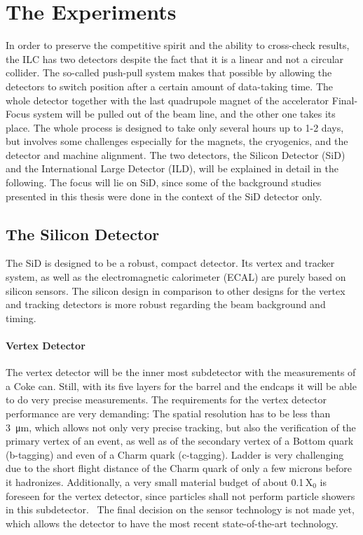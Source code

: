 \newpage
\section{The Experiments}
\label{ILC:detectors}
In order to preserve the competitive spirit and the ability to cross-check results, the ILC has two detectors despite the fact that it is a linear and not a circular collider.
The so-called push-pull system makes that possible by allowing the detectors to switch position after a certain amount of data-taking time.
The whole detector together with the last quadrupole magnet of the accelerator Final-Focus system will be pulled out of the beam line, and the other one takes its place.
The whole process is designed to take only several hours up to 1-2 days, but involves some challenges especially for the magnets, the cryogenics, and the detector and machine alignment.\cite[p. 28-29]{TDR1}
The two detectors, the Silicon Detector (SiD) and the International Large Detector (ILD), will be explained in detail in the following.
The focus will lie on SiD, since some of the background studies presented in this thesis were done in the context of the SiD detector only.

\subsection{The Silicon Detector}
The SiD is designed to be a robust, compact detector.
Its vertex and tracker system, as well as the electromagnetic calorimeter (ECAL) are purely based on silicon sensors.
The silicon design in comparison to other designs for the vertex and tracking detectors is more robust regarding the beam background and timing.~\cite[cf. p. 57ff]{TDR4}
\paragraph{Vertex Detector}
The vertex detector will be the inner most subdetector with the measurements of a Coke can.
Still, with its five layers for the barrel and the endcaps it will be able to do very precise measurements.
The requirements for the vertex detector performance are very demanding:
The spatial resolution has to be less than \SI{3}{\micro\meter}, which allows not only very precise tracking, but also the verification of the primary vertex of an event, as well as of the secondary vertex of a Bottom quark (b-tagging) and even of a Charm quark (c-tagging).
Ladder is very challenging due to the short flight distance of the Charm quark of only a few microns before it hadronizes.
Additionally, a very small material budget of about 0.1\,X$_0$ is foreseen for the vertex detector, since particles shall not perform particle showers in this subdetector.~\cite{SiD_Update}
The final decision on the sensor technology is not made yet, which allows the detector to have the most recent state-of-the-art technology.
